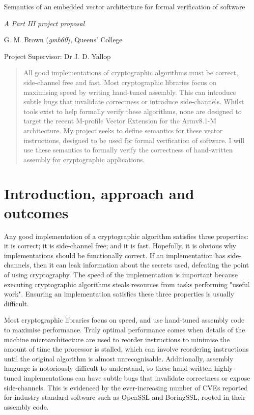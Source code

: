 \documentclass[11pt]{article}
\date{}
\title{}
\begin{document}
\centerline{\Large Semantics of an embedded vector architecture for formal verification of software}
\vspace{2em}
\centerline{\Large \emph{A Part III project proposal}}
\vspace{2em}
\centerline{\large G. M. Brown (\emph{gmb60}), Queens' College}
\vspace{1em}
\centerline{\large Project Supervisor: Dr J. D. Yallop}
\vspace{1em}

\begin{abstract}
All good implementations of cryptographic algorithms must be correct,
side-channel free and fast. Most cryptographic libraries focus on maximising 
speed by writing hand-tuned assembly. This can introduce subtle bugs that
invalidate correctness or introduce side-channels. Whilst tools exist to help
formally verify these algorithms, none are designed to target the recent
M-profile Vector Extension for the Armv8.1-M architecture. My project seeks to
define semantics for these vector instructions, designed to be used for formal
verification of software. I will use these semantics to formally verify the
correctness of hand-written assembly for cryptographic applications.
\end{abstract}

\section{Introduction, approach and outcomes}
\label{sec:org5125d85}

Any good implementation of a cryptographic algorithm satisfies three
properties: it is correct; it is side-channel free; and it is fast. Hopefully,
it is obvious why implementations should be functionally correct. If an
implementation has side-channels, then it can leak information about the
secrets used, defeating the point of using cryptography. The
speed of the implementation is important because executing cryptographic
algorithms steals resources from tasks performing "useful work". Ensuring an
implementation satisfies these three properties is usually difficult.

Most cryptographic libraries focus on speed, and use hand-tuned assembly code
to maximise performance. Truly optimal performance comes when details of the
machine microarchitecture are used to reorder instructions to minimise the
amount of time the processor is stalled, which can involve reordering
instructions until the original algorithm is almost unrecognisable.
Additionally, assembly language is notoriously difficult to understand, so
these hand-written highly-tuned implementations can have subtle bugs that
invalidate correctness or expose side-channels. This is evidenced by the
ever-increasing number of CVEs reported for industry-standard software such as
OpenSSL and BoringSSL, rooted in their assembly code.
\end{document}
